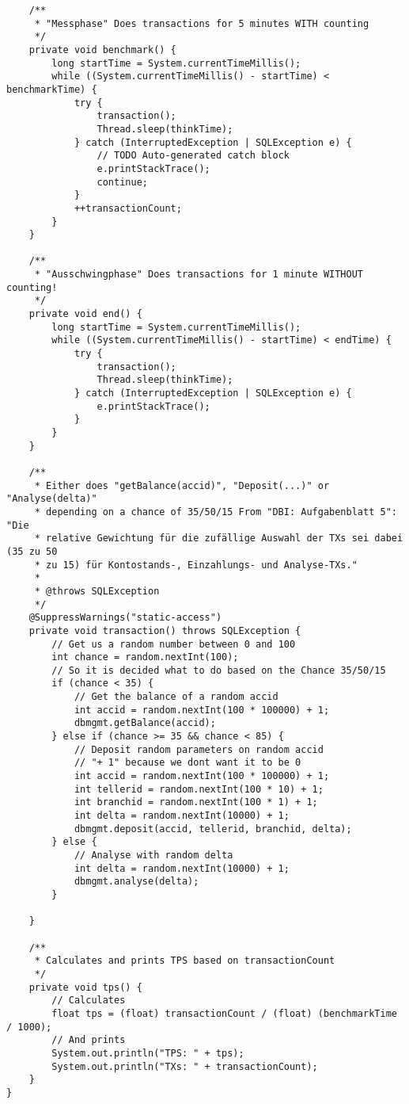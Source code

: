 \documentclass[a4paper, bibliography=totoc, 12pt]{scrartcl}
\begin{document}
\begin{lstlisting}
	/**
	 * "Messphase" Does transactions for 5 minutes WITH counting
	 */
	private void benchmark() {
		long startTime = System.currentTimeMillis();
		while ((System.currentTimeMillis() - startTime) < benchmarkTime) {
			try {
				transaction();
				Thread.sleep(thinkTime);
			} catch (InterruptedException | SQLException e) {
				// TODO Auto-generated catch block
				e.printStackTrace();
				continue;
			}
			++transactionCount;
		}
	}

	/**
	 * "Ausschwingphase" Does transactions for 1 minute WITHOUT counting!
	 */
	private void end() {
		long startTime = System.currentTimeMillis();
		while ((System.currentTimeMillis() - startTime) < endTime) {
			try {
				transaction();
				Thread.sleep(thinkTime);
			} catch (InterruptedException | SQLException e) {
				e.printStackTrace();
			}
		}
	}

	/**
	 * Either does "getBalance(accid)", "Deposit(...)" or "Analyse(delta)"
	 * depending on a chance of 35/50/15 From "DBI: Aufgabenblatt 5": "Die
	 * relative Gewichtung für die zufällige Auswahl der TXs sei dabei (35 zu 50
	 * zu 15) für Kontostands-, Einzahlungs- und Analyse-TXs."
	 * 
	 * @throws SQLException
	 */
	@SuppressWarnings("static-access")
	private void transaction() throws SQLException {
		// Get us a random number between 0 and 100
		int chance = random.nextInt(100);
		// So it is decided what to do based on the Chance 35/50/15
		if (chance < 35) {
			// Get the balance of a random accid
			int accid = random.nextInt(100 * 100000) + 1;
			dbmgmt.getBalance(accid);
		} else if (chance >= 35 && chance < 85) {
			// Deposit random parameters on random accid
			// "+ 1" because we dont want it to be 0
			int accid = random.nextInt(100 * 100000) + 1;
			int tellerid = random.nextInt(100 * 10) + 1;
			int branchid = random.nextInt(100 * 1) + 1;
			int delta = random.nextInt(10000) + 1;
			dbmgmt.deposit(accid, tellerid, branchid, delta);
		} else {
			// Analyse with random delta
			int delta = random.nextInt(10000) + 1;
			dbmgmt.analyse(delta);
		}
		
	}

	/**
	 * Calculates and prints TPS based on transactionCount
	 */
	private void tps() {
		// Calculates
		float tps = (float) transactionCount / (float) (benchmarkTime / 1000);
		// And prints
		System.out.println("TPS: " + tps);
		System.out.println("TXs: " + transactionCount);
	}
}
\end{lstlisting}

	
\end{document}
